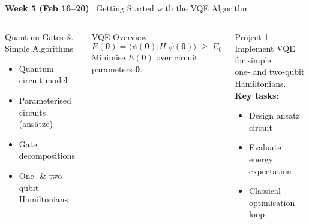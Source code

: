 \documentclass[aspectratio=169,12pt]{beamer}
\newcommand{\ket}[1]{|#1\rangle}
\newcommand{\bra}[1]{\langle#1|}
\newcommand{\week}[1]{\textcolor{qgold}{\textbf{#1}}}
\begin{document}
\begin{frame}{\week{Week 5 (Feb 16--20)} \ Getting Started with the VQE Algorithm}
  \begin{columns}[T]
      \begin{block}{Quantum Gates \& Simple Algorithms}
        \begin{itemize}
          \item Quantum circuit model
          \item Parameterised circuits (ansätze)
          \item Gate decompositions
          \item One- \& two-qubit Hamiltonians
        \end{itemize}
      \end{block}
      \vspace{4pt}
      \begin{block}{VQE Overview}
        \[
          E(\bm{\theta}) = \bra{\psi(\bm{\theta})}H\ket{\psi(\bm{\theta})}
          \;\geq\; E_0
        \]
        Minimise $E(\bm\theta)$ over circuit parameters $\bm\theta$.
      \end{block}
      \begin{alertblock}{Project 1}
        Implement VQE for simple\\
        one- and two-qubit Hamiltonians.\\[4pt]
        \textbf{Key tasks:}
        \begin{itemize}
          \item Design ansatz circuit
          \item Evaluate energy expectation
          \item Classical optimisation loop
        \end{itemize}
      \end{alertblock}
  \end{columns}
\end{frame}
\end{document}
